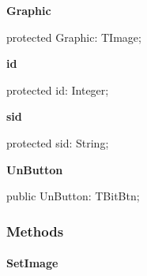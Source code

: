 \documentclass{report}
\newif\ifpdf
\begin{document}
\begin{list}{}
\par  \label{common.TListEntry-Graphic}
\item[\textbf{Graphic}\hfill]
\ifpdf
\begin{flushleft}
\fi
\begin{ttfamily}
protected Graphic: TImage;\end{ttfamily}

\ifpdf
\end{flushleft}
\fi


\par  \label{common.TListEntry-id}
\item[\textbf{id}\hfill]
\ifpdf
\begin{flushleft}
\fi
\begin{ttfamily}
protected id: Integer;\end{ttfamily}

\ifpdf
\end{flushleft}
\fi


\par  \label{common.TListEntry-sid}
\item[\textbf{sid}\hfill]
\ifpdf
\begin{flushleft}
\fi
\begin{ttfamily}
protected sid: String;\end{ttfamily}

\ifpdf
\end{flushleft}
\fi


\par  \label{common.TListEntry-UnButton}
\item[\textbf{UnButton}\hfill]
\ifpdf
\begin{flushleft}
\fi
\begin{ttfamily}
public UnButton: TBitBtn;\end{ttfamily}

\ifpdf
\end{flushleft}
\fi


\par  \end{list}
\subsubsection*{\large{\textbf{Methods}}\normalsize\hspace{1ex}\hfill}
\paragraph*{SetImage}\hspace*{\fill}
\end{document}
